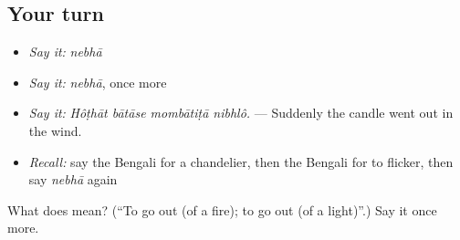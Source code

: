 \subsection*{Your turn}
\begin{itemize}
\raggedright
  \item \emph{Say it:} \emph{nebhā}
  \item \emph{Say it:} \emph{nebhā}, once more
  \item \emph{Say it:} \emph{Hôṭhāt bātāse mombātiṭā nibhlô.} — Suddenly the candle went out in the wind.
  \item \emph{Recall:} say the Bengali for a chandelier, then the Bengali for to flicker, then say \emph{nebhā} again
\end{itemize}

\begin{tcolorbox}[breakable,colback=teal!4,colframe=teal!35!black,title={Before you move on}]
What does  mean? (\textquotedblleft{}To go out (of a fire); to go out (of a light)\textquotedblright{}.) Say it once more.
\end{tcolorbox}
